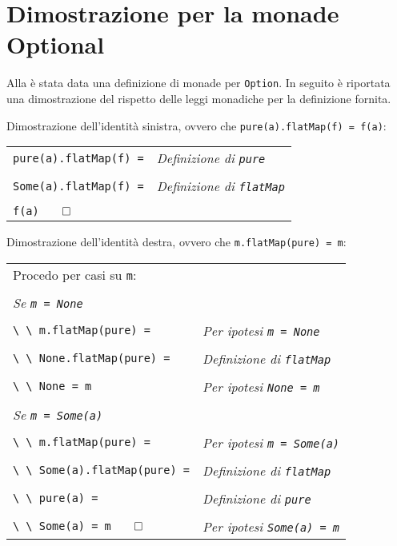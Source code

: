 \section{Dimostrazione per la monade Optional}
\label{dimostrazione-per-la-monade-optional}

Alla  è stata data una definizione di monade per \lstinline{Option}. In seguito è riportata una dimostrazione del rispetto delle leggi monadiche per la definizione fornita.

Dimostrazione dell'identità sinistra, ovvero che \lstinline{pure(a).flatMap(f) = f(a)}:

\begin{tabularx}{\textwidth}{ll}
  \lstinline{pure(a).flatMap(f) =} & \emph{Definizione di \lstinline{pure}}    \\
  \\
  \lstinline{Some(a).flatMap(f) =} & \emph{Definizione di \lstinline{flatMap}} \\
  \\
  \lstinline{f(a)}$\qed$ &
\end{tabularx}

Dimostrazione dell'identità destra, ovvero che \lstinline{m.flatMap(pure) = m}:

\begin{tabularx}{\textwidth}{ll}
  Procedo per casi su \lstinline{m}: &                                                \\
                                     &                                                \\
  \emph{Se \lstinline{m = None}}     &                                                \\
  \\
  \lstinline{\ \ m.flatMap(pure) =} & \emph{Per ipotesi \lstinline{m = None}}         \\
  \\
  \lstinline{\ \ None.flatMap(pure) =} & \emph{Definizione di \lstinline{flatMap}}    \\
  \\
  \lstinline{\ \ None = m} & \emph{Per ipotesi \lstinline{None = m}}                  \\
  \\
  \emph{Se \lstinline{m = Some(a)}}  &                                                \\
  \\
  \lstinline{\ \ m.flatMap(pure) =} & \emph{Per ipotesi \lstinline{m = Some(a)}}      \\
  \\
  \lstinline{\ \ Some(a).flatMap(pure) =} & \emph{Definizione di \lstinline{flatMap}} \\
  \\
  \lstinline{\ \ pure(a) =} & \emph{Definizione di \lstinline{pure}}                  \\
  \\
  \lstinline{\ \ Some(a) = m}$\qed$ & \emph{Per ipotesi \lstinline{Some(a) = m}}
\end{tabularx}

